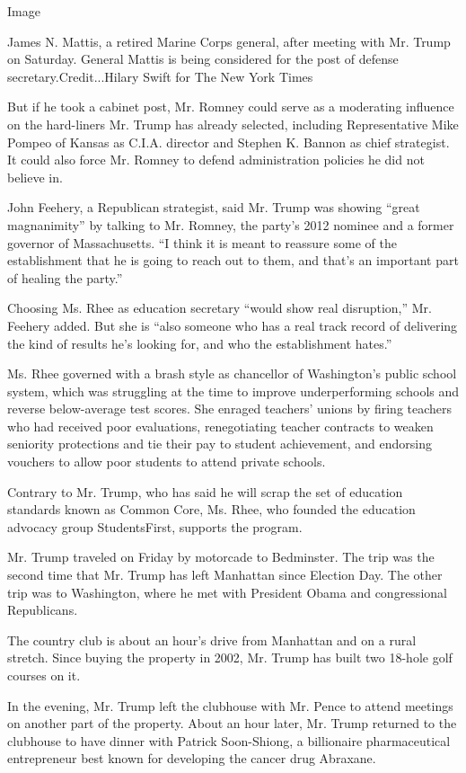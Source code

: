 Image

James N. Mattis, a retired Marine Corps general, after meeting with Mr.
Trump on Saturday. General Mattis is being considered for the post of
defense secretary.Credit...Hilary Swift for The New York Times

But if he took a cabinet post, Mr. Romney could serve as a moderating
influence on the hard-liners Mr. Trump has already selected, including
Representative Mike Pompeo of Kansas as C.I.A. director and Stephen K.
Bannon as chief strategist. It could also force Mr. Romney to defend
administration policies he did not believe in.

John Feehery, a Republican strategist, said Mr. Trump was showing
``great magnanimity'' by talking to Mr. Romney, the party's 2012 nominee
and a former governor of Massachusetts. ``I think it is meant to
reassure some of the establishment that he is going to reach out to
them, and that's an important part of healing the party.''

Choosing Ms. Rhee as education secretary ``would show real disruption,''
Mr. Feehery added. But she is ``also someone who has a real track record
of delivering the kind of results he's looking for, and who the
establishment hates.''

Ms. Rhee governed with a brash style as chancellor of Washington's
public school system, which was struggling at the time to improve
underperforming schools and reverse below-average test scores. She
enraged teachers' unions by firing teachers who had received poor
evaluations, renegotiating teacher contracts to weaken seniority
protections and tie their pay to student achievement, and endorsing
vouchers to allow poor students to attend private schools.

Contrary to Mr. Trump, who has said he will scrap the set of education
standards known as Common Core, Ms. Rhee, who founded the education
advocacy group StudentsFirst, supports the program.

Mr. Trump traveled on Friday by motorcade to Bedminster. The trip was
the second time that Mr. Trump has left Manhattan since Election Day.
The other trip was to Washington, where he met with President Obama and
congressional Republicans.

The country club is about an hour's drive from Manhattan and on a rural
stretch. Since buying the property in 2002, Mr. Trump has built two
18-hole golf courses on it.

In the evening, Mr. Trump left the clubhouse with Mr. Pence to attend
meetings on another part of the property. About an hour later, Mr. Trump
returned to the clubhouse to have dinner with Patrick Soon-Shiong, a
billionaire pharmaceutical entrepreneur best known for developing the
cancer drug Abraxane.

